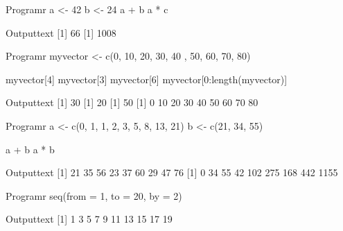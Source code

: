 
\begin{code}
    {Program}{r}
a <- 42
b <- 24
a + b
a * c
\end{code}
\begin{code}
    {Output}{text}
[1] 66
[1] 1008
\end{code}

\begin{code}
    {Program}{r}
myvector <- c(0, 10, 20, 30, 40 , 50, 60, 70, 80)

myvector[4]
myvector[3]
myvector[6]
myvector[0:length(myvector)]
\end{code}
\begin{code}
    {Output}{text}
[1] 30
[1] 20
[1] 50
[1]  0 10 20 30 40 50 60 70 80
\end{code}

\begin{code}
    {Program}{r}
a <- c(0, 1, 1, 2, 3, 5, 8, 13, 21)
b <- c(21, 34, 55)

a + b
a * b
\end{code}
\begin{code}
    {Output}{text}
[1] 21 35 56 23 37 60 29 47 76
[1]    0   34   55   42  102  275  168  442 1155
\end{code}
\newpage

\begin{code}
    {Program}{r}
seq(from = 1, to = 20, by = 2)
\end{code}
\begin{code}
    {Output}{text}
[1]  1  3  5  7  9 11 13 15 17 19
\end{code}

